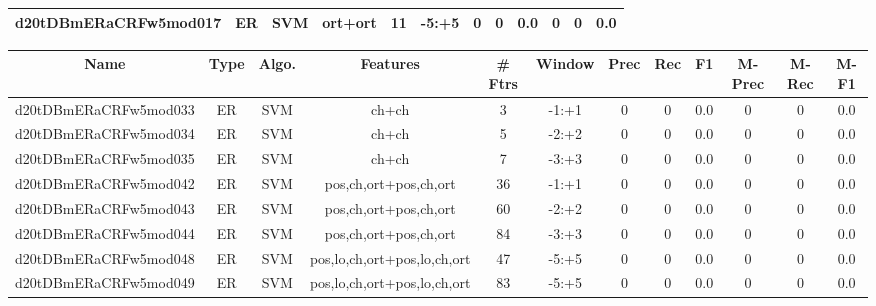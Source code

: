 \documentclass[a4paper]{article}
\begin{document}
\begin{landscape}
\begin{center}
\begin{tabular}{ |c|c|c|c|c|c|c|c|c|c|c|c|}
 
 	
 	\small{ d20tDBmERaCRFw5mod017 } & ER & SVM & ort+ort  &  11 &  -5:+5  &  0 & 0 & 0.0  &  0 & 0 & 0.0 \\
 	
 \hline
\end{tabular}
\end{center}




\begin{center}
\begin{tabular}{ |c|c|c|c|c|c|c|c|c|c|c|c|} 
 \hline
 	Name & Type & Algo. & Features & \# Ftrs & Window & Prec & Rec & F1 & M-Prec & M-Rec & M-F1\\
 \hline

 	

 
 	
 	\small{ d20tDBmERaCRFw5mod033 } & ER & SVM & ch+ch  &  3 &  -1:+1  &  0 & 0 & 0.0  &  0 & 0 & 0.0 \\
 	

 
 	
 	\small{ d20tDBmERaCRFw5mod034 } & ER & SVM & ch+ch  &  5 &  -2:+2  &  0 & 0 & 0.0  &  0 & 0 & 0.0 \\
 	

 
 	
 	\small{ d20tDBmERaCRFw5mod035 } & ER & SVM & ch+ch  &  7 &  -3:+3  &  0 & 0 & 0.0  &  0 & 0 & 0.0 \\
 	

 
 	
 	\small{ d20tDBmERaCRFw5mod042 } & ER & SVM & pos,ch,ort+pos,ch,ort  &  36 &  -1:+1  &  0 & 0 & 0.0  &  0 & 0 & 0.0 \\
 	

 
 	
 	\small{ d20tDBmERaCRFw5mod043 } & ER & SVM & pos,ch,ort+pos,ch,ort  &  60 &  -2:+2  &  0 & 0 & 0.0  &  0 & 0 & 0.0 \\
 	

 
 	
 	\small{ d20tDBmERaCRFw5mod044 } & ER & SVM & pos,ch,ort+pos,ch,ort  &  84 &  -3:+3  &  0 & 0 & 0.0  &  0 & 0 & 0.0 \\
 	

 
 	
 	\small{ d20tDBmERaCRFw5mod048 } & ER & SVM & pos,lo,ch,ort+pos,lo,ch,ort  &  47 &  -5:+5  &  0 & 0 & 0.0  &  0 & 0 & 0.0 \\
 	

 
 	
 	\small{ d20tDBmERaCRFw5mod049 } & ER & SVM & pos,lo,ch,ort+pos,lo,ch,ort  &  83 &  -5:+5  &  0 & 0 & 0.0  &  0 & 0 & 0.0 \\
 	


\end{tabular}
\end{center}
\end{landscape}
\end{document}
